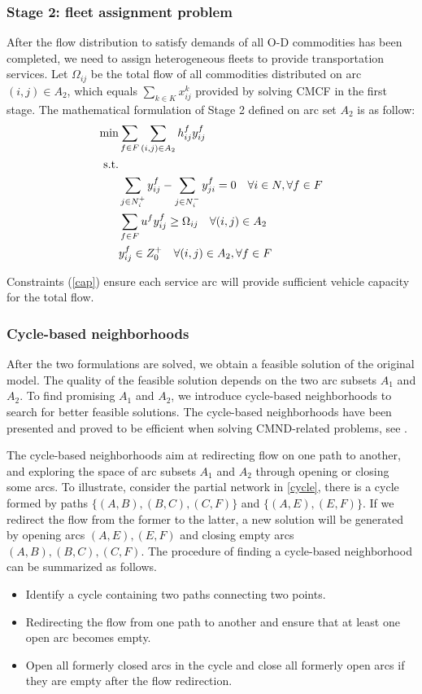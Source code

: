 \documentclass[11pt,nonblindrev,fleqn]{article}
\begin{document}
\subsubsection{Stage 2: fleet assignment problem}
After the flow distribution to satisfy demands of all O-D commodities has been completed, we need to assign heterogeneous fleets to provide transportation services. Let $\Omega_{ij}$ be the total flow of all commodities distributed on arc $(i,j) \in A_2$, which equals $\sum_{k\in K}x_{ij}^k$ provided by solving CMCF in the first stage. The mathematical formulation of Stage 2 defined on arc set $A_2$ is as follow:
\begin{align}
  \min & \sum_{f\in F}\sum_{(i,j)\in A_2} h_{ij}^f y_{ij}^f \\
    \rm{s.t.} & \nonumber \\
     & \sum_{j\in N_i^+}y_{ij}^f - \sum_{j\in N_i^-}y_{ji}^f = 0     \quad      \forall i\in N,\forall f\in F  \\
     & \sum_{f\in F} u^f y_{ij}^f \geq \Omega_{ij}      \quad       \forall (i,j)\in A_2   \label{cap} \\
     & y_{ij}^f \in Z_0^+       \quad       \forall (i,j)\in A_2, \forall f\in F
\end{align}

Constraints (\ref{cap}) ensure each service arc will provide sufficient vehicle capacity for the total flow.

\subsubsection{Cycle-based neighborhoods}
After the two formulations are solved, we obtain a feasible solution of the original model. The quality of the feasible solution depends on the two arc subsets $A_1$ and $A_2$. To find promising $A_1$ and $A_2$, we introduce cycle-based neighborhoods to search for better feasible solutions. The cycle-based neighborhoods have been presented and proved to be efficient when solving CMND-related problems, see \cite{Ghamlouche2003Cycle, Ghamlouche2004Path,Li2016Design}.

The cycle-based neighborhoods aim at redirecting flow on one path to another, and exploring the space of arc subsets $A_1$ and $A_2$ through opening or closing some arcs. To illustrate, consider the partial network in \ref{cycle}, there is a cycle formed by paths $\{ (A,B),(B,C),(C,F) \}$ and $\{ (A,E),(E,F)\}$. If we redirect the flow from the former to the latter, a new solution will be generated by opening arcs $(A,E),(E,F)$ and closing empty arcs $(A,B),(B,C),(C,F)$. The procedure of finding a cycle-based neighborhood can be summarized as follows.
\begin{itemize}
  \item Identify a cycle containing two paths connecting two points.
  \item Redirecting the flow from one path to another and ensure that at least one open arc becomes empty.
  \item Open all formerly closed arcs in the cycle and close all formerly open arcs if they are empty after the flow redirection.
\end{itemize}
\end{document}
